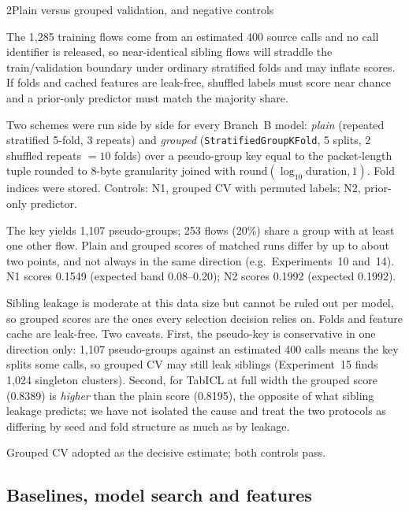 \begin{explog}{2}{Plain versus grouped validation, and negative controls}
\item[Hypothesis] The 1{,}285 training flows come from an estimated 400 source calls and no call
identifier is released, so near-identical sibling flows will straddle the
train/validation boundary under ordinary stratified folds and may inflate scores.
If folds and cached features are leak-free, shuffled labels must score near
chance and a prior-only predictor must match the majority share.
\item[Method] Two schemes were run side by side for every Branch~B model: \emph{plain}
(repeated stratified 5-fold, 3 repeats) and \emph{grouped}
(\texttt{StratifiedGroupKFold}, 5 splits, 2 shuffled repeats $=10$ folds) over a
pseudo-group key equal to the packet-length tuple rounded to 8-byte granularity
joined with $\mathrm{round}(\log_{10}\mathrm{duration},1)$. Fold indices were
stored. Controls: N1, grouped CV with permuted labels; N2, prior-only predictor.
\item[Result] The key yields 1{,}107 pseudo-groups; 253 flows (20\%) share a group with
at least one other flow. Plain and grouped scores of matched runs differ by up
to about two points, and not always in the same direction (e.g.\ Experiments~10
and~14). N1 scores 0.1549 (expected band 0.08--0.20); N2 scores 0.1992
(expected 0.1992).
\item[Inference] Sibling leakage is moderate at this data size but cannot be ruled out per
model, so grouped scores are the ones every selection decision relies on. Folds
and feature cache are leak-free. Two caveats. First, the pseudo-key is
conservative in one direction only: 1{,}107 pseudo-groups against an estimated
400 calls means the key splits some calls, so grouped CV may still leak siblings
(Experiment~15 finds 1{,}024 singleton clusters). Second, for TabICL at full
width the grouped score (0.8389) is \emph{higher} than the plain score (0.8195),
the opposite of what sibling leakage predicts; we have not isolated the cause and
treat the two protocols as differing by seed and fold structure as much as by
leakage.
\item[Verdict] Grouped CV adopted as the decisive estimate; both controls pass.
\end{explog}

\subsection{Baselines, model search and features}


